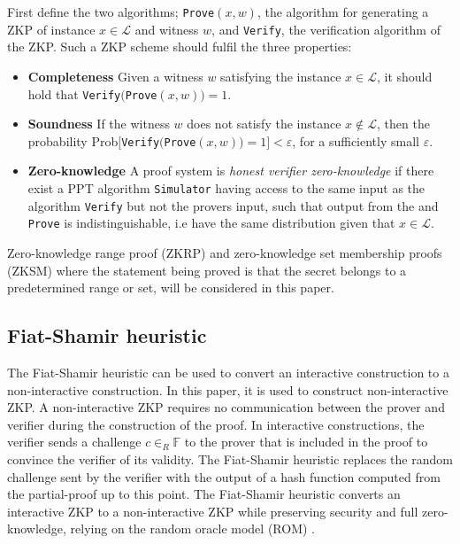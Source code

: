 \begin{Mydef}
\label{def:ZKP}
First define the two algorithms;  \texttt{Prove}$(x,w)$, the algorithm for generating a ZKP of instance $x\in\mathcal{L}$ and witness $w$, and  \texttt{Verify}, the verification algorithm of the ZKP. Such a ZKP scheme  should fulfil the three properties: 
\begin{itemize}
\item \textbf{Completeness} Given a witness $w$ satisfying the instance $x\in\mathcal{L}$, it should hold that \texttt{Verify}$($\texttt{Prove}$(x,w)) = 1$. 
\item \textbf{Soundness} If the witness $w$ does not satisfy the  instance $x\notin\mathcal{L}$, then the probability  Prob$[$\texttt{Verify}$($\texttt{Prove}$(x,w)) = 1] < \varepsilon$, for a sufficiently small $\varepsilon$. 
\item  \textbf{Zero-knowledge} A proof system is \textit{honest verifier zero-knowledge} if there exist a PPT algorithm \texttt{Simulator} having access to the same input as the algorithm \texttt{Verify} but not the provers input, such that output from the  and \texttt{Prove} is indistinguishable, i.e have the same distribution given that $x\in\mathcal{L}$.  
\end{itemize}
\end{Mydef}
 
Zero-knowledge range proof (ZKRP) and zero-knowledge set membership proofs (ZKSM) where the statement being proved is that the secret belongs to a predetermined range or set, will be considered in this paper.


\subsection*{Fiat-Shamir heuristic}
The Fiat-Shamir heuristic \cite{Fiat-Shamir} can be used to convert an interactive construction to a non-interactive construction. In this paper, it is used to construct non-interactive ZKP. A non-interactive  ZKP requires no communication between the prover and verifier during the construction of the proof. In interactive constructions, the verifier sends a challenge $c\in_R\mathds{F}$ to the prover that is included in the proof to convince the verifier of its validity. The Fiat-Shamir heuristic replaces the random challenge sent by the verifier with the output of a hash function computed from the partial-proof up to this point. The Fiat-Shamir heuristic converts an interactive ZKP to a non-interactive  ZKP while preserving security and full zero-knowledge, relying on the random oracle model (ROM) \cite{Fiat-Shamir} .




